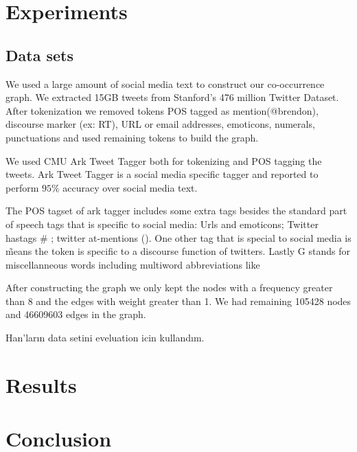 \section{Experiments}
\label{sec:experiments}

\subsection{Data sets}

We used a large amount of social media text to construct our co-occurrence graph. We extracted 15GB tweets from Stanford's 476 million Twitter Dataset\cite{DBLP:conf/wsdm/YangL11}. After tokenization we removed tokens POS tagged as mention(@brendon), discourse marker (ex: RT), URL or email addresses, emoticons, numerals, punctuations and used remaining tokens to build the graph.

We used CMU Ark Tweet Tagger\cite{DBLP:conf/naacl/OwoputiODGSS13}\cite{Gimpel:2011:PTT:2002736.2002747} both for tokenizing and POS tagging the tweets. Ark Tweet Tagger is a social media specific tagger and reported to perform $95\%$ accuracy over social media text.


The POS tagset of ark tagger includes some extra tags besides the standard part of speech tags that is specific to social media: Urls and emoticons; Twitter hastags \# ; twitter at-mentions (\@). One other tag that is special to social media is \~ means the token is specific to a discourse function of twitters. Lastly G stands for miscellanneous words including multiword abbreviations like


After constructing the graph we only kept the nodes with a frequency greater than 8 and the edges with weight greater than 1. We had remaining 105428 nodes and 46609603 edges in the graph.

Han'ların data setini eveluation icin kullandım.

\section{Results}


\section{Conclusion}
